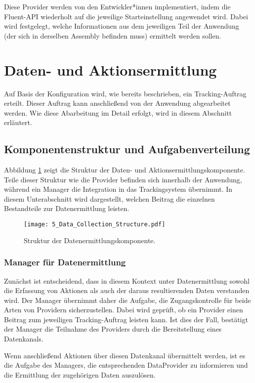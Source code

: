 Diese Provider werden von den Entwickler*innen implementiert, indem die Fluent-API wiederholt auf die jeweilige Starteinstellung angewendet wird. Dabei wird festgelegt, welche Informationen aus dem jeweiligen Teil der Anwendung (der sich in derselben Assembly befinden muss) ermittelt werden sollen.

\section{Daten- und Aktionsermittlung}
\label{sec:data_collection_concept}
Auf Basis der Konfiguration wird, wie bereits beschrieben, ein Tracking-Auftrag erteilt. Dieser Auftrag kann anschließend von der Anwendung abgearbeitet werden. Wie diese Abarbeitung im Detail erfolgt, wird in diesem Abschnitt erläutert.

\subsection{Komponentenstruktur und Aufgabenverteilung}
Abbildung \ref{fig:structure_data_collection} zeigt die Struktur der Daten- und Aktionsermittlungskomponente. Teile dieser Struktur wie die Provider befinden sich innerhalb der Anwendung, während ein Manager die Integration in das Trackingsystem übernimmt. In diesem Unterabschnitt wird dargestellt, welchen Beitrag die einzelnen Bestandteile zur Datenermittlung leisten.

\begin{figure}[H]
\centering
\texttt{[image: 5\_Data\_Collection\_Structure.pdf]}
\caption{Struktur der Datenermittlungskomponente.}
\label{fig:structure_data_collection}
\end{figure}

\subsubsection{Manager für Datenermittlung}
Zunächst ist entscheidend, dass in diesem Kontext unter Datenermittlung sowohl die Erfassung von Aktionen als auch der daraus resultierenden Daten verstanden wird. Der Manager übernimmt daher die Aufgabe, die Zugangskontrolle für beide Arten von Providern sicherzustellen. Dabei wird geprüft, ob ein Provider einen Beitrag zum jeweiligen Tracking-Auftrag leisten kann. Ist dies der Fall, bestätigt der Manager die Teilnahme des Providers durch die Bereitstellung eines Datenkanals.

Wenn anschließend Aktionen über diesen Datenkanal übermittelt werden, ist es die Aufgabe des Managers, die entsprechenden DataProvider zu informieren und die Ermittlung der zugehörigen Daten auszulösen.

